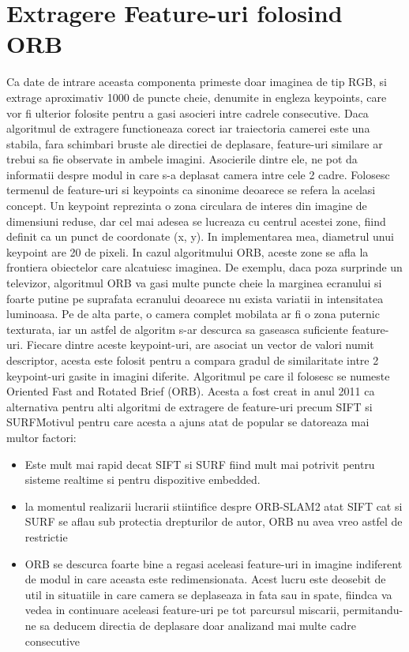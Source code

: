 \documentclass[12pt,a4paper]{report}
\begin{document}
\section{Extragere Feature-uri folosind ORB} 
Ca date de intrare aceasta componenta primeste doar imaginea de tip RGB, si extrage
aproximativ 1000 de puncte cheie, denumite in engleza keypoints, care
vor fi ulterior folosite pentru a gasi asocieri intre cadrele consecutive. 
Daca algoritmul de extragere functioneaza corect iar traiectoria camerei este una
stabila, fara schimbari bruste ale directiei de deplasare, feature-uri similare ar 
trebui sa fie observate in ambele imagini. Asocierile dintre ele, ne pot da 
informatii despre modul in care s-a deplasat camera intre cele 2 cadre.
Folosesc termenul de feature-uri si keypoints ca sinonime deoarece se refera la acelasi
concept. Un keypoint reprezinta o zona circulara de interes din imagine de dimensiuni
reduse, dar cel mai adesea se lucreaza cu centrul acestei zone, fiind definit ca 
un punct de coordonate (x, y). In implementarea mea, diametrul unui keypoint are 20
de pixeli. In cazul algoritmului ORB, aceste zone se afla la frontiera obiectelor care 
alcatuiesc imaginea. De exemplu, daca poza surprinde un televizor, algoritmul ORB va 
gasi multe puncte cheie la marginea ecranului si foarte putine pe suprafata ecranului 
deoarece nu exista variatii in intensitatea luminoasa. Pe de alta parte, o camera 
complet mobilata ar fi o zona puternic texturata, iar un astfel de algoritm s-ar 
descurca sa gaseasca suficiente feature-uri. Fiecare dintre aceste keypoint-uri, are 
asociat un vector de valori numit descriptor, acesta este folosit pentru a compara gradul
de similaritate intre 2 keypoint-uri gasite in imagini diferite.
Algoritmul pe care il folosesc se numeste Oriented Fast and Rotated Brief (ORB).
Acesta a fost creat in anul 2011 ca alternativa pentru alti algoritmi de extragere de
feature-uri precum SIFT si SURF\. Motivul pentru care acesta a ajuns atat de popular 
se datoreaza mai multor factori:
\begin{itemize}
    \item Este mult mai rapid decat SIFT si SURF fiind mult mai potrivit pentru sisteme
realtime si pentru dispozitive embedded.
    \item la momentul realizarii lucrarii stiintifice despre ORB-SLAM2 atat SIFT cat 
si SURF se aflau sub protectia drepturilor de autor, ORB nu avea vreo astfel de restrictie
    \item ORB se descurca foarte bine a regasi aceleasi feature-uri in imagine
indiferent de modul in care aceasta este redimensionata. Acest lucru este deosebit 
de util in situatiile in care camera se deplaseaza in fata sau in spate, fiindca
va vedea in continuare aceleasi feature-uri pe tot parcursul miscarii, permitandu-ne
sa deducem directia de deplasare doar analizand mai multe cadre consecutive
\end{itemize}
\end{document}
